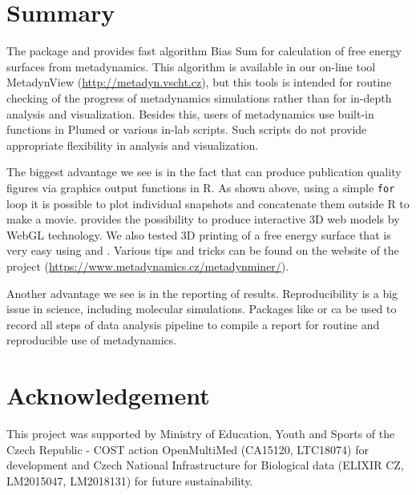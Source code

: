 \hypertarget{summary}{%
\section{Summary}\label{summary}}

The package  and  provides
fast algorithm Bias Sum \citep{petr} for calculation of free energy
surfaces from metadynamics. This algorithm is available in our on-line
tool MetadynView (\url{http://metadyn.vscht.cz}), but this tools is
intended for routine checking of the progress of metadynamics
simulations rather than for in-depth analysis and visualization. Besides
this, users of metadynamics use built-in functions in Plumed or various
in-lab scripts. Such scripts do not provide appropriate flexibility in
analysis and visualization.

The biggest advantage we see is in the fact that 
can produce publication quality figures via graphics output functions in
R. As shown above, using a simple \texttt{for} loop it is possible to
plot individual snapshots and concatenate them outside R to make a
movie.  provides the possibility to produce
interactive 3D web models by WebGL technology. We also tested 3D
printing of a free energy surface that is very easy using
 and . Various tips and tricks
can be found on the website of the project
(\url{https://www.metadynamics.cz/metadynminer/}).

Another advantage we see is in the reporting of results. Reproducibility
is a big issue in science, including molecular simulations. Packages
like  or  ca be used to record all
steps of data analysis pipeline to compile a report for routine and
reproducible use of metadynamics.

\hypertarget{acknowledgement}{%
\section{Acknowledgement}\label{acknowledgement}}

This project was supported by Ministry of Education, Youth and Sports of
the Czech Republic - COST action OpenMultiMed (CA15120, LTC18074) for
development and Czech National Infrastructure for Biological data
(ELIXIR CZ, LM2015047, LM2018131) for future sustainability.



\address{%
Dalibor Trapl\\
Department of Biochemistry and Microbiology, University of Chemistry and
Technology, Prague\\%
Technicka 3\\ Prague 6, 166 28, Czech Republic\\
%
%
\textit{ORCiD: \href{https://orcid.org/0000-0002-3435-5841}{0000-0002-3435-5841}}\\%
\href{mailto:dalibor.trapl@gmail.com}{\nolinkurl{dalibor.trapl@gmail.com}}%
}

